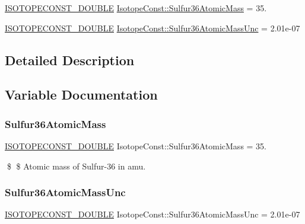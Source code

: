 \begin{DoxyCompactItemize}
\item 
\mbox{\hyperlink{group___isotope_const-_macros_ga8f45a7272ce02c0b4c65c44636ed719a}{I\+S\+O\+T\+O\+P\+E\+C\+O\+N\+S\+T\+\_\+\+D\+O\+U\+B\+LE}} \mbox{\hyperlink{group___isotope_const-_sulfur-_s36_gaa9c3bc685538efb9560bd86294c75f95}{Isotope\+Const\+::\+Sulfur36\+Atomic\+Mass}} = 35.
\item 
\mbox{\hyperlink{group___isotope_const-_macros_ga8f45a7272ce02c0b4c65c44636ed719a}{I\+S\+O\+T\+O\+P\+E\+C\+O\+N\+S\+T\+\_\+\+D\+O\+U\+B\+LE}} \mbox{\hyperlink{group___isotope_const-_sulfur-_s36_ga51ceab088bb036f6c930418206e6dc11}{Isotope\+Const\+::\+Sulfur36\+Atomic\+Mass\+Unc}} = 2.\+01e-\/07
\end{DoxyCompactItemize}


\subsection{Detailed Description}


\subsection{Variable Documentation}
\mbox{\label{group___isotope_const-_sulfur-_s36_gaa9c3bc685538efb9560bd86294c75f95}} 
\subsubsection{\texorpdfstring{Sulfur36\+Atomic\+Mass}{Sulfur36AtomicMass}}
{\footnotesize\ttfamily \mbox{\hyperlink{group___isotope_const-_macros_ga8f45a7272ce02c0b4c65c44636ed719a}{I\+S\+O\+T\+O\+P\+E\+C\+O\+N\+S\+T\+\_\+\+D\+O\+U\+B\+LE}} Isotope\+Const\+::\+Sulfur36\+Atomic\+Mass = 35.}

\$ \$ Atomic mass of Sulfur-\/36 in amu. \mbox{\label{group___isotope_const-_sulfur-_s36_ga51ceab088bb036f6c930418206e6dc11}} 
\subsubsection{\texorpdfstring{Sulfur36\+Atomic\+Mass\+Unc}{Sulfur36AtomicMassUnc}}
{\footnotesize\ttfamily \mbox{\hyperlink{group___isotope_const-_macros_ga8f45a7272ce02c0b4c65c44636ed719a}{I\+S\+O\+T\+O\+P\+E\+C\+O\+N\+S\+T\+\_\+\+D\+O\+U\+B\+LE}} Isotope\+Const\+::\+Sulfur36\+Atomic\+Mass\+Unc = 2.\+01e-\/07}

